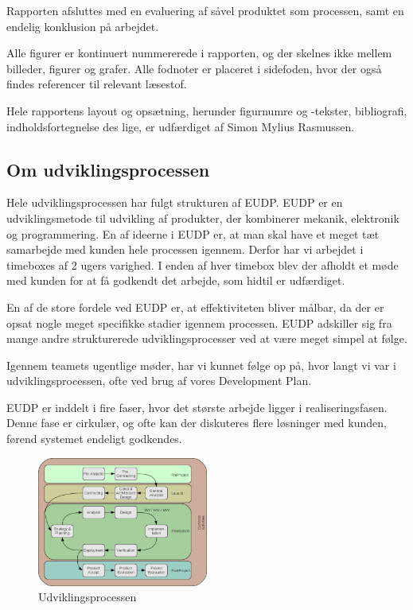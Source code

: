 Rapporten afsluttes med en evaluering af såvel produktet som processen, samt en endelig konklusion på arbejdet. 

Alle figurer er kontinuert nummererede i rapporten, og der skelnes ikke mellem billeder, figurer og grafer. Alle fodnoter er placeret i sidefoden, hvor der også findes referencer til relevant læsestof.%

Hele rapportens layout og opsætning, herunder figurnumre og -tekster, bibliografi, indholdsfortegnelse des lige, er udfærdiget af Simon Mylius Rasmussen.

\subsection{Om udviklingsprocessen}
\label{sec:om-udvikl}

Hele udviklingsprocessen har fulgt strukturen af EUDP. EUDP er en udviklingsmetode til udvikling af produkter, der kombinerer mekanik, elektronik og programmering. En af ideerne i EUDP er, at man skal have et meget tæt samarbejde med kunden hele processen igennem. Derfor har vi arbejdet i timeboxes af 2 ugers varighed. I enden af hver timebox blev der afholdt et møde med kunden for at få godkendt det arbejde, som hidtil er udfærdiget. 

En af de store fordele ved EUDP er, at effektiviteten bliver målbar, da der er opsat nogle meget specifikke stadier igennem processen. EUDP adskiller sig fra mange andre strukturerede udviklingsprocesser ved at være meget simpel at følge. 

Igennem teamets ugentlige møder, har vi kunnet følge op på, hvor langt vi var i udviklingsprocessen, ofte ved brug af vores Development Plan. 

EUDP er inddelt i fire faser, hvor det største arbejde ligger i realiseringsfasen. Denne fase er cirkulær, og ofte kan der diskuteres flere løsninger med kunden, førend systemet endeligt godkendes. 

\begin{figure}[h]
  \centering
  \includegraphics[width=0.5\textwidth]{./figurer/ij1.png}
  \caption[Udviklingsprocessen]{Udviklingsprocessen\protect\footnotemark}
  \label{fig:ij1}
\end{figure}


